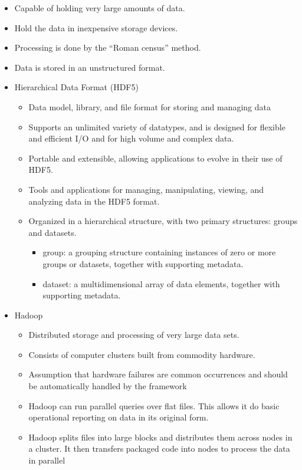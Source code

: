 \begin{itemize}
	\item Capable of holding very large amounts of data.
	\item Hold the data in inexpensive storage devices.
	\item Processing is done by the “Roman census” method.
	\item Data is stored in an unstructured format.
	\item Hierarchical Data Format (HDF5)
	\begin{itemize}
		\item Data model, library, and file format for storing and managing data
		\item Supports an unlimited variety of datatypes, and is designed for flexible and efficient I/O and for high volume and complex data. 
		\item Portable and extensible, allowing applications to evolve in their use of HDF5.
		\item Tools and applications for managing, manipulating, viewing, and analyzing data in the HDF5 format. 
		\item Organized in a hierarchical structure, with two primary structures: groups and datasets. 
		\begin{itemize}
			\item group: a grouping structure containing instances of zero or more groups or datasets, together with supporting metadata. 
			\item dataset: a multidimensional array of data elements, together with supporting metadata. 
		\end{itemize}
	\end{itemize}
	\item Hadoop
	\begin{itemize}
		\item Distributed storage and processing of very large data sets. 
		\item Consists of computer clusters built from commodity hardware.
		\item Assumption that hardware failures are common occurrences and should be automatically handled by the framework
		\item Hadoop can run parallel queries over flat files. This allows it do basic operational reporting on data in its original form.
		\item Hadoop splits files into large blocks and distributes them across nodes in a cluster. It then transfers packaged code into nodes to process the data in parallel

\end{itemize}
\end{itemize}
